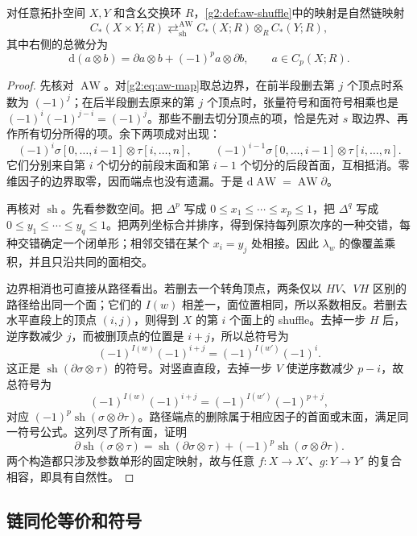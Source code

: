 \begin{proposition}\label{g2:prop:aw-shuffle-chain-maps}
	对任意拓扑空间 \(X,Y\) 和含幺交换环 \(R\)，\cref{g2:def:aw-shuffle}中的映射是自然链映射
	\[
		C_*(X\times Y;R)
		\mathrel{\mathop{\rightleftarrows}^{\operatorname{AW}}_{\operatorname{sh}}}
		C_*(X;R)\otimes_R C_*(Y;R),
	\]
	其中右侧的总微分为
	\[
		\mathrm{d}(a\otimes b)=\partial a\otimes b+(-1)^p a\otimes\partial b,
		\qquad a\in C_p(X;R).
	\]
\end{proposition}
\begin{proof}
	先核对 \(\operatorname{AW}\)。对\eqref{g2:eq:aw-map}取总边界，在前半段删去第 \(j\) 个顶点时系数为 \((-1)^j\)；在后半段删去原来的第 \(j\) 个顶点时，张量符号和面符号相乘也是 \((-1)^i(-1)^{j-i}=(-1)^j\)。那些不删去切分顶点的项，恰是先对 \(s\) 取边界、再作所有切分所得的项。余下两项成对出现：
	\[
		(-1)^i\sigma[0,\ldots,i-1]\otimes\tau[i,\ldots,n],
		\qquad
		(-1)^{i-1}\sigma[0,\ldots,i-1]\otimes\tau[i,\ldots,n].
	\]
	它们分别来自第 \(i\) 个切分的前段末面和第 \(i-1\) 个切分的后段首面，互相抵消。零维因子的边界取零，因而端点也没有遗漏。于是 \(\mathrm{d}\operatorname{AW}=\operatorname{AW}\partial\)。

	再核对 \(\operatorname{sh}\)。先看参数空间。把 \(\Delta^p\) 写成 \(0\le x_1\le\cdots\le x_p\le1\)，把 \(\Delta^q\) 写成 \(0\le y_1\le\cdots\le y_q\le1\)。把两列坐标合并排序，得到保持每列原次序的一种交错，每种交错确定一个闭单形；相邻交错在某个 \(x_i=y_j\) 处相接。因此 \(\lambda_w\) 的像覆盖乘积，并且只沿共同的面相交。

	边界相消也可直接从路径看出。若删去一个转角顶点，两条仅以 \(HV\)、\(VH\) 区别的路径给出同一个面；它们的 \(I(w)\) 相差一，面位置相同，所以系数相反。若删去水平直段上的顶点 \((i,j)\)，则得到 \(X\) 的第 \(i\) 个面上的 shuffle。去掉一步 \(H\) 后，逆序数减少 \(j\)，而被删顶点的位置是 \(i+j\)，所以总符号为
	\[
		(-1)^{I(w)}(-1)^{i+j}=(-1)^{I(w')}(-1)^i.
	\]
	这正是 \(\operatorname{sh}(\partial\sigma\otimes\tau)\) 的符号。对竖直直段，去掉一步 \(V\) 使逆序数减少 \(p-i\)，故总符号为
	\[
		(-1)^{I(w)}(-1)^{i+j}=(-1)^{I(w')}(-1)^{p+j},
	\]
	对应 \((-1)^p\operatorname{sh}(\sigma\otimes\partial\tau)\)。路径端点的删除属于相应因子的首面或末面，满足同一符号公式。这列尽了所有面，证明
	\[
		\partial\operatorname{sh}(\sigma\otimes\tau)
		=\operatorname{sh}(\partial\sigma\otimes\tau)
			+(-1)^p\operatorname{sh}(\sigma\otimes\partial\tau).
	\]
	两个构造都只涉及参数单形的固定映射，故与任意 \(f:X\to X'\)、\(g:Y\to Y'\) 的复合相容，即具有自然性。
\end{proof}

\subsection{链同伦等价和符号}
\label{g2:subsec:0403:02}

